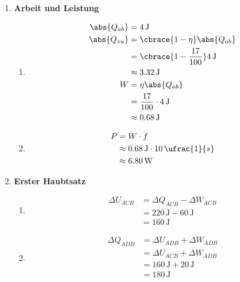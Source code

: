 \documentclass[11pt,letterpaper]{article}
\begin{document}
\begin{enumerate}
    \item \textbf{Arbeit und Leistung}
        \begin{enumerate}
            \item 
            \begin{align*}
                \abs{Q _{ab}} &= 4\,\mathrm{J}\\
                \abs{Q _{zu}} &= \cbrace{1-\eta} \abs{Q_{ab}}\\
                &= \cbrace{1-\frac{17}{100}} 4\,\mathrm{J}\\
                &\approx 3.32 \,\mathrm{J}\\
                W &= \eta  \abs{Q _{ab}}\\
                &= \frac{17}{100}\cdot 4\,\mathrm{J}\\
                &\approx 0.68 \,\mathrm{J}\\
            \end{align*}

            \item 
            \begin{align*}
                P &= W \cdot f\\
                &\approx 0.68 \,\mathrm{J} \cdot 10\,\ufrac{1}{s}\\
                &\approx 6.80 \,\mathrm{W}
            \end{align*}
            
        \end{enumerate}

    \item \textbf{Erster Haubtsatz}
        \begin{enumerate}
            \item 
            \begin{align*}
                \Delta U_{ACB} &= \Delta Q_{ACB} - \Delta W_{ACB}\\
                &= 220 \,\mathrm{J} - 60 \,\mathrm{J}\\
                &= 160 \,\mathrm{J}
            \end{align*}

            \item 
            \begin{align*}
                \Delta Q_{ADB} &= \Delta U_{ADB}  + \Delta W_{ADB}\\
                &= \Delta U_{ACB}  + \Delta W_{ADB}\\
                &= 160\,\mathrm{J} + 20 \,\mathrm{J}\\
                &= 180 \,\mathrm{J}\\
            \end{align*}


\end{enumerate}
\end{enumerate}
\end{document}
